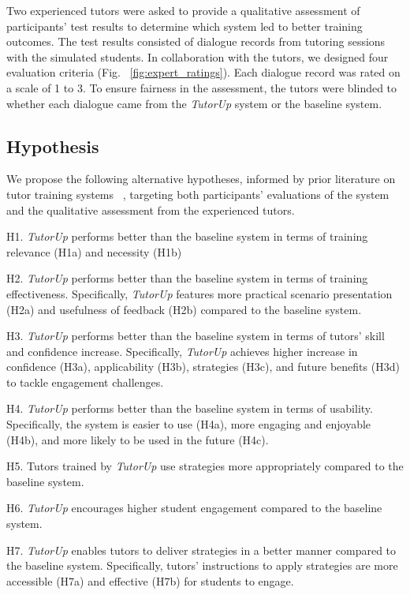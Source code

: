 Two experienced tutors were asked to provide a qualitative assessment of participants' test results to determine which system led to better training outcomes. The test results consisted of dialogue records from tutoring sessions with the simulated students. In collaboration with the tutors, we designed four evaluation criteria (Fig. ~\ref{fig:expert_ratings}). Each dialogue record was rated on a scale of 1 to 3. To ensure fairness in the assessment, the tutors were blinded to whether each dialogue came from the \textit{TutorUp} system or the baseline system.





\subsection{Hypothesis}
We propose the following alternative hypotheses, informed by prior literature on tutor training systems ~\cite{kirkpatrick1994, howcroft2020twenty}, targeting both participants' evaluations of the system and the qualitative assessment from the experienced tutors.

H1. \textit{TutorUp} performs better than the baseline system in terms of training relevance (H1a) and  necessity (H1b)

H2. \textit{TutorUp} performs better than the baseline system in terms of training effectiveness. Specifically, \textit{TutorUp} features more practical scenario presentation (H2a) and usefulness of feedback (H2b) compared to the baseline system.

H3. \textit{TutorUp} performs better than the baseline system in terms of tutors' skill and confidence increase. Specifically, \textit{TutorUp} achieves higher increase in confidence (H3a), applicability (H3b), strategies (H3c), and future benefits (H3d) to tackle engagement challenges.

H4. \textit{TutorUp} performs better than the baseline system in terms of usability. Specifically, the system is easier to use (H4a), more engaging and enjoyable (H4b), and more likely to be used in the future (H4c).

H5. Tutors trained by \textit{TutorUp} use strategies more appropriately compared to the baseline system. 

H6. \textit{TutorUp} encourages higher student engagement compared to the baseline system. 

H7. \textit{TutorUp} enables tutors to deliver strategies in a better manner compared to the baseline system. Specifically, tutors' instructions to apply strategies are more accessible (H7a) and effective (H7b) for students to engage. 